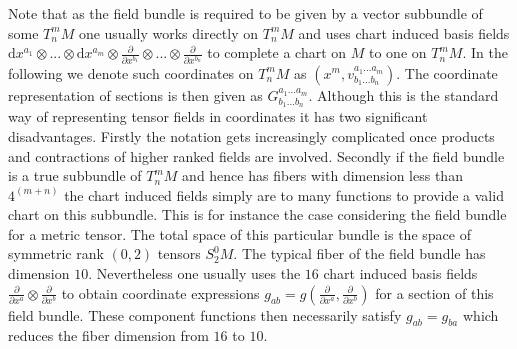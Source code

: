 \documentclass[a4paper,12pt, DIV=14, BCOR=5mm, twoside, headsepline, numbers=noenddot]{scrbook}
\begin{document}
Note that as the field bundle is required to be given by a vector subbundle of some $T^m_n M$ one usually works directly on $T^m_n M$ and uses chart induced basis fields $\mathrm{d}x^{a_1}\otimes ... \otimes \mathrm{d}x^{a_m} \otimes \frac{\partial}{\partial x^{b_1}} \otimes ... \otimes \frac{\partial}{\partial x^{b_n}}$ to complete a chart on $M$ to one on $T ^m _ n M$. In the following we denote such coordinates on $T^m_n M$ as $(x^m, v^{a_1 ... a_m}_{b_1 ... b_n})$. The coordinate representation of sections is then given as $G^{a_1 ... a_m}_{b_1 ... b_n}$. Although this is the standard way of representing tensor fields in coordinates it has two significant disadvantages. Firstly the notation gets increasingly complicated once products and contractions of higher ranked fields are involved. Secondly if the field bundle is a true subbundle of $T^m_nM$ and hence has fibers with dimension less than $4^{(m+n)}$ the chart induced fields simply are to many functions to provide a valid chart on this subbundle. This is for instance the case considering the field bundle for a metric tensor. The total space of this particular bundle is the space of symmetric rank $(0,2)$ tensors $S^0_2M$. The typical fiber of the field bundle has dimension $10$. Nevertheless one usually uses the $16$ chart induced basis fields $ \frac{\partial}{\partial x^a}  \otimes \frac{\partial}{\partial x^b}$ to obtain coordinate expressions $g_{ab} = g(\frac{\partial}{\partial x^a},\frac{\partial}{\partial x^b})$ for a section of this field bundle. These component functions then necessarily satisfy $g_{ab} = g_{ba}$ which reduces the fiber dimension from $16$ to $10$. 
\end{document}

